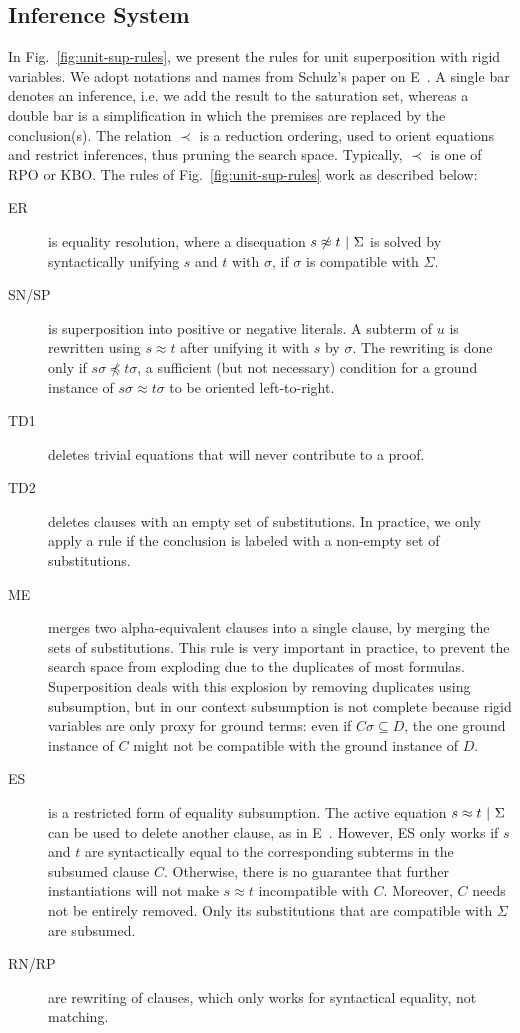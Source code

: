 \subsection{Inference System}

In Fig.~\ref{fig:unit-sup-rules}, we present the rules for unit superposition
with rigid variables. We adopt notations and names from Schulz's paper on
E~\cite{SS02}. A single bar denotes an inference, i.e. we add the result to the
saturation set, whereas a double bar is a simplification in which the premises
are replaced by the conclusion(s). The relation $\prec$ is a reduction ordering,
used to orient equations and restrict inferences, thus pruning the search space.
Typically, $\prec$ is one of RPO or KBO. The rules of
Fig.~\ref{fig:unit-sup-rules} work as described below:

\begin{description}
\item[ER] is equality resolution, where a disequation
$s \not\approx t ~|~ \Sigma$ is solved by syntactically unifying
$s$ and $t$ with $\sigma$, if $\sigma$ is compatible with $\Sigma$.
\item[SN/SP] is superposition into positive or negative literals. A subterm of $u$ is rewritten
using $s \approx t$ after unifying it with $s$ by $\sigma$. The rewriting is
done only if $s\sigma \not\preceq t\sigma$, a sufficient (but not necessary)
condition for a ground instance of $s\sigma \approx t\sigma$ to be oriented
left-to-right.
\item[TD1] deletes trivial equations that will never contribute to a proof.
\item[TD2] deletes clauses with an empty set of substitutions. In practice, we
only apply a rule if the conclusion is labeled with a non-empty set of
substitutions.
\item[ME] merges two alpha-equivalent clauses into a single clause, by merging
the sets of substitutions. This rule is very important in practice, to prevent
the search space from exploding due to the duplicates of most formulas.
Superposition deals with this explosion by removing duplicates using
subsumption, but in our context subsumption is not complete because rigid
variables are only proxy for ground terms: even if $C\sigma \subseteq D$, the
one ground instance of $C$ might not be compatible with the ground instance of
$D$.
\item[ES] is a restricted form of equality subsumption. The active equation
$ s\approx t ~|~ \Sigma $ can be used to delete another clause, as
in E~\cite{SS02}. However, ES only works if $s$ and $t$ are syntactically equal
to the corresponding subterms in the subsumed clause $C$. Otherwise, there is no
guarantee that further instantiations will not make $s\approx t$ incompatible
with $C$. Moreover, $C$ needs not be entirely removed. Only its substitutions
that are compatible with $\Sigma$ are subsumed.
\item[RN/RP] are rewriting of clauses, which only works for syntactical
equality, not matching.
\end{description}

